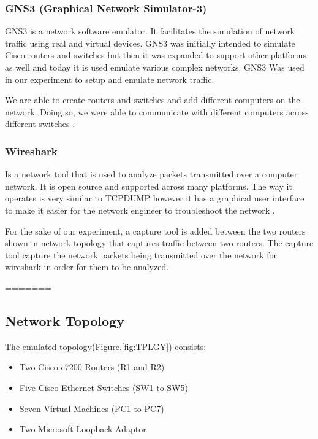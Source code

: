 \documentclass{article}
\begin{document}
\subsubsection{GNS3 (Graphical Network Simulator-3)}
GNS3 is a network software emulator. It facilitates the simulation of network traffic using real and virtual devices. GNS3 was initially intended to simulate Cisco routers and switches but then it was expanded to support other platforms as well and today it is used emulate various complex networks.  GNS3 Was used in our experiment to setup and emulate network traffic. 


We are able to create routers and switches and add different computers on the network. Doing so, we were able to communicate with different computers across different switches \cite{hassine2014toward}.


\subsubsection{Wireshark}
Is a network tool that is used to analyze packets transmitted over a computer network. It is open source and supported across many platforms. The way it operates is very similar to TCPDUMP however it has a graphical user interface to make it easier for the network engineer to troubleshoot the network \cite{orebaugh2006wireshark}.


For the sake of our experiment, a capture tool is added between the two routers shown in network topology that captures traffic between two routers. The capture tool capture the network packets being transmitted over the network for wireshark in order for them to be analyzed.

=======

\subsection{Network Topology}

The emulated topology(Figure.\ref{fig:TPLGY}) consists:

\begin{itemize}
	
	\item Two Cisco c7200 Routers (R1 and R2)
	\item Five Cisco Ethernet Switches (SW1 to SW5)
	\item Seven Virtual Machines (PC1 to PC7)
	\item Two Microsoft Loopback Adaptor 
\end{itemize}
\end{document}
